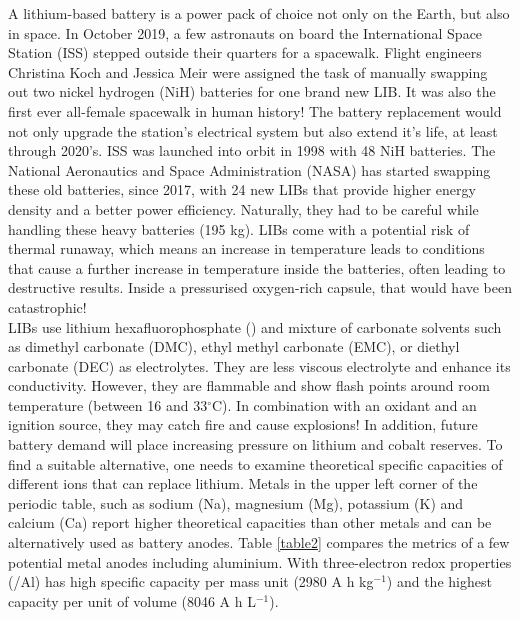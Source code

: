 A lithium-based battery is a power pack of choice not only on the Earth, but also in space. In October 2019, a few astronauts on board the International Space Station (ISS) stepped outside their quarters for a spacewalk. Flight engineers Christina Koch and Jessica Meir were assigned the task of manually swapping out two nickel hydrogen (NiH) batteries for one brand new LIB. It was also the first ever all-female spacewalk in human history! The battery replacement would not only upgrade the station's electrical system but also extend it's life, at least through 2020's. ISS was launched into orbit in 1998 with 48 NiH batteries. The National Aeronautics and Space Administration (NASA) has started swapping these old batteries, since 2017, with 24 new LIBs  that provide higher energy density and a better power efficiency. Naturally, they had to be careful while handling these heavy batteries (195 kg). LIBs come with a potential risk of thermal runaway, which means an increase in temperature leads to conditions that cause a further increase in temperature inside the batteries, often leading to destructive results. Inside a pressurised oxygen-rich capsule, that would have been catastrophic!\\
LIBs use lithium hexafluorophosphate () and mixture of carbonate solvents such as dimethyl carbonate (DMC), ethyl methyl carbonate (EMC), or diethyl carbonate (DEC) as electrolytes. They are less viscous electrolyte and enhance its conductivity. However, they are flammable and show flash points around room temperature (between 16 and 33$^{\circ}$C). In combination with an oxidant and an ignition source, they may catch fire and cause explosions! In addition, future battery demand will place increasing pressure on lithium and cobalt reserves\cite{turcheniuk_ten_2018}. To find a suitable alternative, one needs to examine theoretical specific capacities of different ions that can replace lithium. Metals in the upper left corner of the periodic table, such as sodium (Na), magnesium (Mg), potassium (K) and calcium (Ca) report higher theoretical capacities than other metals and can be alternatively used as battery anodes. Table  \ref{table2} compares the metrics of a few potential metal anodes including aluminium. With three-electron redox properties (/Al) has high specific capacity per mass unit (2980 A h kg$^{-1}$) and the highest capacity per unit of volume (8046 A h L$^{-1}$)\cite{ambroz_trends_2017}.

